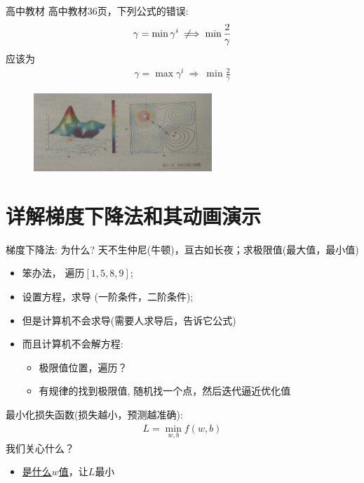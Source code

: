 \documentclass[handout]{ctexbeamer}
\begin{document}
\begin{frame}{高中教材}
	高中教材36页，下列公式的错误:
	\begin{align*}
		\gamma = \min \gamma^{i} \;\not\!\!\implies   \min \frac{2}{\gamma}
	\end{align*}
	应该为
	\begin{align*}
		\gamma = \max \gamma^{i}  \ \Rightarrow \ \min \frac{2}{\gamma}
	\end{align*}
\begin{figure}[H]
	\centering
	\includegraphics[width=0.6\textwidth]{fig/textbookGD}
\end{figure}
\end{frame}



\section{详解梯度下降法和其动画演示}

\begin{frame}{梯度下降法: 为什么?}
	天不生仲尼(牛顿)，亘古如长夜；求极限值(最大值，最小值)
	\begin{itemize}
	\setlength\itemsep{0.6em}
		\item 笨办法， 遍历$[1, 5, 8, 9]$;
		\item 设置方程，求导 (一阶条件，二阶条件);
		\item 但是计算机不会求导(需要人求导后，告诉它公式)
		\item 而且计算机不会解方程: \begin{itemize}
		\setlength\itemsep{0.3em}
		\item 极限值位置，遍历？
		\item 有规律的找到极限值, 随机找一个点，然后迭代逼近优化值
		\end{itemize}
	\end{itemize}
	最小化损失函数(损失越小，预测越准确):
	\begin{align*}
		L = \min_{w, b} f(w, b) 
	\end{align*}
	我们关心什么？
	\begin{itemize}
		\item \underline{是什么$w$值}，让$L$最小
	\end{itemize}
\end{frame}
\end{document}
